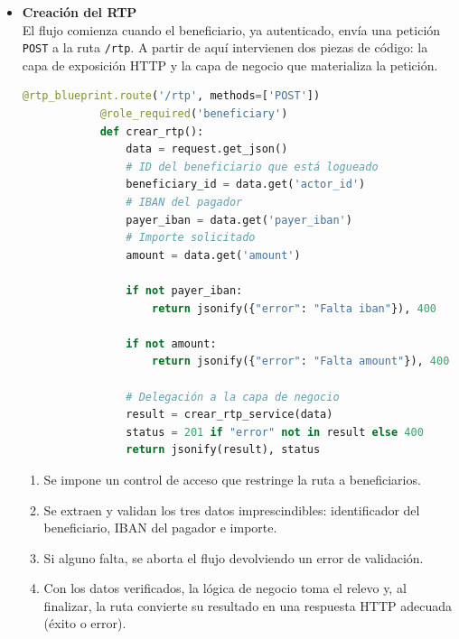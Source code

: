 \begin{itemize}
    \item \textbf{Creación del RTP}\\[6pt]
        El flujo comienza cuando el beneficiario, ya autenticado, envía una
        petición \texttt{POST} a la ruta \texttt{/rtp}.  
        A partir de aquí intervienen dos piezas de código: la capa de
        exposición HTTP y la capa de negocio que materializa la petición.
        \vspace{0.6em}

       \begin{lstlisting}[language=Python, style=custom, caption={Endpoint creación de solicitud RTP}]
            @rtp_blueprint.route('/rtp', methods=['POST'])
            @role_required('beneficiary')
            def crear_rtp():
                data = request.get_json()
                # ID del beneficiario que está logueado
                beneficiary_id = data.get('actor_id')
                # IBAN del pagador
                payer_iban = data.get('payer_iban')
                # Importe solicitado
                amount = data.get('amount')

                if not payer_iban:
                    return jsonify({"error": "Falta iban"}), 400

                if not amount:
                    return jsonify({"error": "Falta amount"}), 400

                # Delegación a la capa de negocio
                result = crear_rtp_service(data)
                status = 201 if "error" not in result else 400
                return jsonify(result), status
        \end{lstlisting}

        \begin{enumerate}
           \item Se impone un control de acceso que restringe la ruta a
                 beneficiarios.  
           \item Se extraen y validan los tres datos imprescindibles:
                 identificador del beneficiario, IBAN del pagador e importe.  
           \item Si alguno falta, se aborta el flujo devolviendo un error de
                 validación.  
           \item Con los datos verificados, la lógica de negocio toma el
                 relevo y, al finalizar, la ruta convierte su resultado en una
                 respuesta HTTP adecuada (éxito o error).
        \end{enumerate}
        \vspace{0.8em}


\end{itemize}
